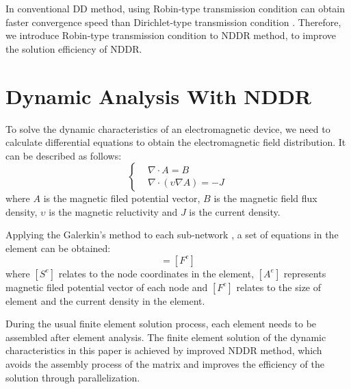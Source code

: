 \documentclass[journal,transmag]{IEEEtran}
\begin{document}
In conventional DD method, using Robin-type transmission condition  can obtain faster convergence speed than Dirichlet-type transmission condition \cite{IEEEhowto:Douglas}. Therefore, we introduce Robin-type transmission condition to NDDR method, to improve the solution efficiency of NDDR.
\section{Dynamic Analysis With NDDR}
To solve the dynamic characteristics of an electromagnetic device, we need to calculate differential equations to obtain the electromagnetic field distribution. It can be described as follows:
\begin{equation}
\left\{
\begin{aligned}
&{\nabla\cdot}A=B\\
&\nabla\cdot({\upsilon\nabla}A)=-J
\end{aligned}
\right.
\end{equation}
where $A$ is the magnetic filed potential vector, $B$ is the magnetic field flux density, $\upsilon$ is the magnetic reluctivity and $J$ is the current density. 

Applying the Galerkin's method to each sub-network \cite{IEEEhowto:Rao}, a set of equations in the element can be obtained:
\begin{equation}
[S^e][A^e]=[F^e]
\end{equation}
where $[S^e]$ relates to the node coordinates in the element, $[A^e]$ represents magnetic filed potential vector of each node and $[F^e]$ relates to the size of element and the current density in the element.

During the usual finite element solution process, each element needs to be assembled after element analysis.
The finite element solution of the dynamic characteristics in this paper is achieved by improved NDDR method, which avoids the assembly process of the matrix and improves the efficiency of the solution through parallelization.
\end{document}

